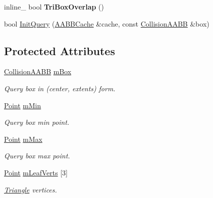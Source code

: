 \begin{DoxyCompactItemize}
\item 
inline\+\_\+ bool {\bfseries Tri\+Box\+Overlap} ()\hypertarget{classOpcode_1_1AABBCollider_a066a75dae5b12b42d93c4368750a3fd4}{}\label{classOpcode_1_1AABBCollider_a066a75dae5b12b42d93c4368750a3fd4}

\item 
bool \hyperlink{classOpcode_1_1AABBCollider_afc5a6945b3c809051fa20b5587047b68}{Init\+Query} (\hyperlink{structOpcode_1_1AABBCache}{A\+A\+B\+B\+Cache} \&cache, const \hyperlink{classOpcode_1_1CollisionAABB}{Collision\+A\+A\+BB} \&box)
\end{DoxyCompactItemize}
\subsection*{Protected Attributes}
\begin{DoxyCompactItemize}
\item 
\hyperlink{classOpcode_1_1CollisionAABB}{Collision\+A\+A\+BB} \hyperlink{classOpcode_1_1AABBCollider_a9e8ed12586372d9d4de78a6a93cf9781}{m\+Box}\hypertarget{classOpcode_1_1AABBCollider_a9e8ed12586372d9d4de78a6a93cf9781}{}\label{classOpcode_1_1AABBCollider_a9e8ed12586372d9d4de78a6a93cf9781}

\begin{DoxyCompactList}\small\item\em Query box in (center, extents) form. \end{DoxyCompactList}\item 
\hyperlink{classOpcode_1_1Point}{Point} \hyperlink{classOpcode_1_1AABBCollider_a400889f0a812283de13b327824c15b26}{m\+Min}\hypertarget{classOpcode_1_1AABBCollider_a400889f0a812283de13b327824c15b26}{}\label{classOpcode_1_1AABBCollider_a400889f0a812283de13b327824c15b26}

\begin{DoxyCompactList}\small\item\em Query box min point. \end{DoxyCompactList}\item 
\hyperlink{classOpcode_1_1Point}{Point} \hyperlink{classOpcode_1_1AABBCollider_a1e32eb32df46d71ed66ab4bfa7fa192f}{m\+Max}\hypertarget{classOpcode_1_1AABBCollider_a1e32eb32df46d71ed66ab4bfa7fa192f}{}\label{classOpcode_1_1AABBCollider_a1e32eb32df46d71ed66ab4bfa7fa192f}

\begin{DoxyCompactList}\small\item\em Query box max point. \end{DoxyCompactList}\item 
\hyperlink{classOpcode_1_1Point}{Point} \hyperlink{classOpcode_1_1AABBCollider_a347899641399dc3a082999d1f034b177}{m\+Leaf\+Verts} \mbox{[}3\mbox{]}\hypertarget{classOpcode_1_1AABBCollider_a347899641399dc3a082999d1f034b177}{}\label{classOpcode_1_1AABBCollider_a347899641399dc3a082999d1f034b177}

\begin{DoxyCompactList}\small\item\em \hyperlink{classOpcode_1_1Triangle}{Triangle} vertices. \end{DoxyCompactList}\end{DoxyCompactItemize}


